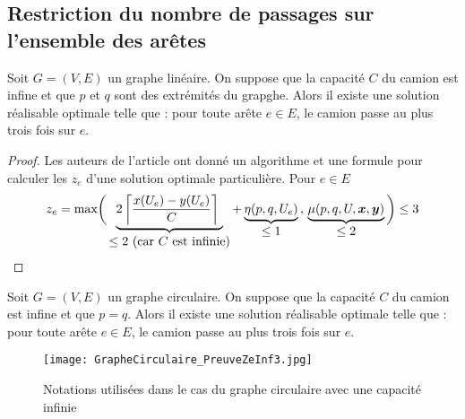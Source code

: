 \subsection{Restriction du nombre de passages sur l'ensemble des arêtes}

\begin{prop}\label{Ze inf 3 - lineaire}
Soit $G=(V,E)$ un graphe linéaire. On suppose que la capacité $C$ du camion est infine et que $p$ et $q$ sont des extrémités du grapghe. Alors il existe une solution réalisable optimale telle que : pour toute arête $e \in E$, le camion passe au plus trois fois sur $e$.
\end{prop}

\begin{proof}
Les auteurs de l'article \cite{Benchimol2011} ont donné un algorithme et une formule pour calculer les $z_e$ d'une solution optimale particulière. Pour $e \in E$
\begin{gather*}
  z_e = \mbox{max}
  \bigg(
    \underbrace{ 2 \left\lceil \frac{x(U_e)-y(U_e)}{C} \right\rceil\ }_{\displaystyle \le 2 \mbox{ (car } C\mbox{ est infinie)} } +
    \underbrace{ \eta(p,q,U_e) }_{\displaystyle \le 1}\,,\,
    \underbrace{ \mu(p,q,U,\bs{x},\bs{y}) }_{\displaystyle \le 2}
  \bigg)
  \le 3
\end{gather*}
\end{proof}

\begin{lem}\label{Ze inf 3 - circulaire}
Soit $G=(V,E)$ un graphe circulaire. On suppose que la capacité $C$ du camion est infine et que $p=q$. Alors il existe une solution réalisable optimale telle que : pour toute arête $e \in E$, le camion passe au plus trois fois sur $e$.
\end{lem}

\begin{figure}[ht]
  \centering
  \texttt{[image: GrapheCirculaire\_PreuveZeInf3.jpg]}
  \caption{Notations utilisées dans le cas du graphe circulaire avec une capacité infinie}
  \label{Notation graphe circulaire preuve Ze inf 3}
\end{figure}

